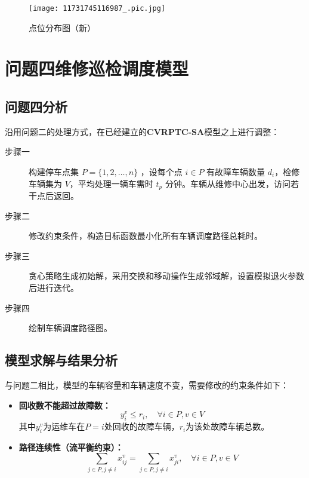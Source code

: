 \documentclass[withoutpreface,bwprint]{cumcmthesis}
\begin{document}
\begin{figure}[H]
  \centering
  \texttt{[image: 11731745116987\_.pic.jpg]} %
  \caption{点位分布图（新）} 
  \label{fig:点位分布图（新）}
\end{figure}




\section{问题四\hspace{1em}维修巡检调度模型}
\subsection{问题四分析}
沿用问题二的处理方式，在已经建立的\textbf{CVRPTC-SA}模型之上进行调整：
\begin{description}
    \item[步骤一] 构建停车点集  $P = \{1, 2, \dots, n\}$ ，设每个点  $i \in P $ 有故障车辆数量  $d_i $，检修车辆集为 $ V $，平均处理一辆车需时  $t_p $ 分钟。车辆从维修中心出发，访问若干点后返回。
    \item[步骤二] 修改约束条件，构造目标函数最小化所有车辆调度路径总耗时。
    \item[步骤三] 贪心策略生成初始解，采用交换和移动操作生成邻域解，设置模拟退火参数后进行迭代。
    \item[步骤四] 绘制车辆调度路径图。

\end{description}
\subsection{模型求解与结果分析}
与问题二相比，模型的车辆容量和车辆速度不变，需要修改的约束条件如下：
\begin{itemize}
    \item \textbf{回收数不能超过故障数：}
    \begin{equation}    
    y_i^v \leq r_i, \quad \forall i \in P, v \in V
    \end{equation}
    其中$y_i^v$为运维车在$P=i$处回收的故障车辆，$r_i$为该处故障车辆总数。
    \item \textbf{路径连续性（流平衡约束）：}
    \begin{equation}    
    \sum_{j \in P, j \neq i} x_{ij}^v = \sum_{j \in P, j \neq i} x_{ji}^v, \quad \forall i \in P, v \in V
    \end{equation}
    
\end{itemize}
\end{document}
